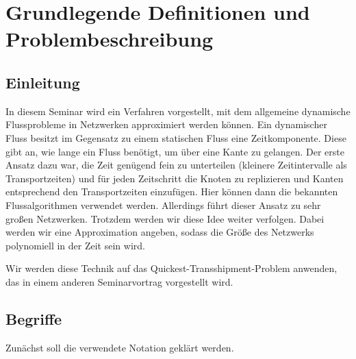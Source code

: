 
\section{Grundlegende Definitionen und Problembeschreibung}\label{sec:problem}

\subsection{Einleitung}

In diesem Seminar wird ein Verfahren vorgestellt, mit dem allgemeine dynamische
Flussprobleme in Netzwerken approximiert werden können. Ein dynamischer Fluss
besitzt im
Gegensatz zu einem statischen Fluss eine Zeitkomponente. Diese gibt an, wie
lange ein Fluss benötigt, um über eine Kante zu gelangen. Der erste Ansatz
dazu war, die Zeit genügend fein zu unterteilen (kleinere Zeitintervalle
als Transportzeiten) und für jeden Zeitschritt die Knoten zu replizieren und
Kanten entsprechend den Transportzeiten einzufügen. Hier können dann die
bekannten Flussalgorithmen verwendet werden. Allerdings führt dieser Ansatz
zu sehr großen Netzwerken. Trotzdem werden wir diese Idee weiter verfolgen.
Dabei werden wir eine Approximation angeben, sodass die Größe des Netzwerks
polynomiell in der Zeit sein wird.

Wir werden diese Technik auf das Quickest-Transshipment-Problem anwenden,
das in einem anderen Seminarvortrag vorgestellt wird.

\subsection{Begriffe}
Zunächst soll die verwendete Notation geklärt werden.

